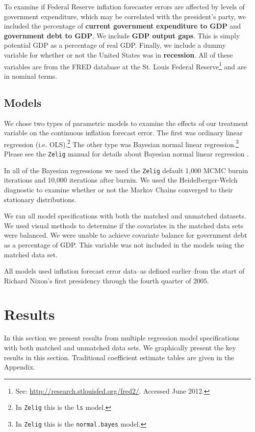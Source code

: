 \documentclass[a4paper]{article}\usepackage{graphicx, color}
\begin{document}
To examine if Federal Reserve inflation forecaster errors are affected by levels of government expenditure, which may be correlated with the president's party, we included the percentage of {\bf{current government expenditure to GDP}} and {\bf{government debt to GDP}}. We include {\bf{GDP output gaps}}. This is simply potential GDP as a percentage of real GDP. Finally, we include a dummy variable for whether or not the United States was in {\bf{recession}}. All of these variables are from the FRED database at the St. Louis Federal Reserve\footnote{See: {\url{http://research.stlouisfed.org/fred2/}}. Accessed June 2012.} and are in nominal terms.

\subsection{Models}

We chose two types of parametric models to examine the effects of our treatment variable on the continuous inflation forecast error. The first was ordinary linear regression (i.e. OLS).\footnote{In {\tt{Zelig}} this is the {\tt{ls}} model.} The other type was Bayesian normal linear regression.\footnote{In {\tt{Zelig}} this is the {\tt{normal.bayes}} model.} Please see the {\tt{Zelig}} manual for details about Bayesian normal linear regression \citep{Goodrich2007}. 

In all of the Bayesian regressions we used the {\tt{Zelig}} default 1,000 MCMC burnin iterations and 10,000 iterations after burnin. We used the Heidelberger-Welch diagnostic to examine whether or not the Markov Chains converged to their stationary distributions.

We ran all model specifications with both the matched and unmatched datasets. We used visual methods to determine if the covariates in the matched data sets were balanced. We were unable to achieve covariate balance for government debt as a percentage of GDP. This variable was not included in the models using the matched data set.

All models used inflation forecast error data--as defined earlier--from the start of Richard Nixon's first presidency through the fourth quarter of 2005. 

\section{Results}

In this section we present results from multiple regression model specifications with both matched and unmatched data sets. We graphically present the key results in this section. Traditional coefficient estimate tables are given in the Appendix.
\end{document}
